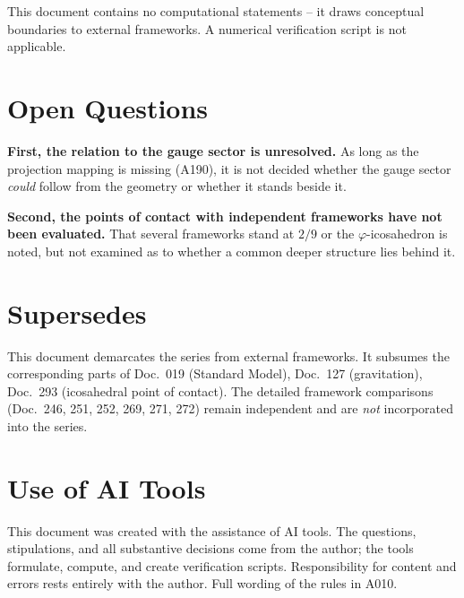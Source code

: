 This document contains no computational statements -- it draws conceptual
boundaries to external frameworks. A numerical verification script is not
applicable.

\section{Open Questions}

\textbf{First, the relation to the gauge sector is unresolved.} As long as the
projection mapping is missing (A190), it is not decided whether the gauge sector
\emph{could} follow from the geometry or whether it stands beside it.

\textbf{Second, the points of contact with independent frameworks have not been
evaluated.} That several frameworks stand at $2/9$ or the $\varphi$-icosahedron
is noted, but not examined as to whether a common deeper structure lies behind it.

\section{Supersedes}

This document demarcates the series from external frameworks. It subsumes the
corresponding parts of Doc.~019 (Standard Model), Doc.~127 (gravitation),
Doc.~293 (icosahedral point of contact). The detailed framework comparisons
(Doc.~246, 251, 252, 269, 271, 272) remain independent and are \emph{not}
incorporated into the series.

\section{Use of AI Tools}

This document was created with the assistance of AI tools. The questions,
stipulations, and all substantive decisions come from the author; the tools
formulate, compute, and create verification scripts.
Responsibility for content and errors rests entirely with the author.
Full wording of the rules in A010.
